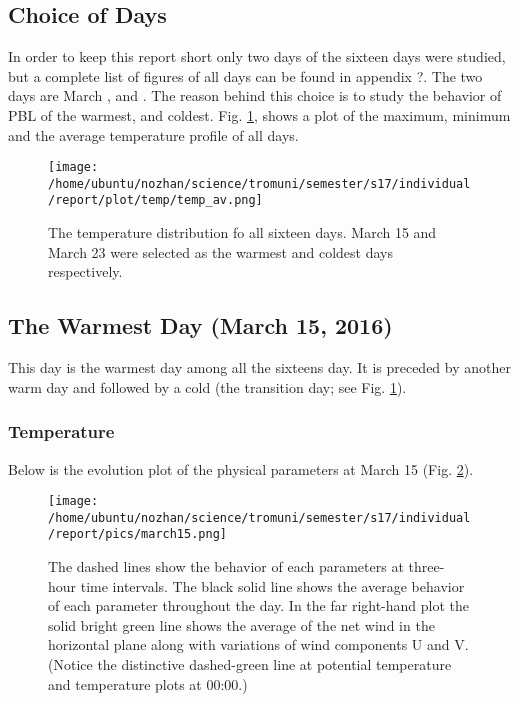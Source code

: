 \documentclass[a4paper,12pt]{article}
\numberwithin{equation}{section} %
\begin{document}
\subsection{Choice of Days}
In order to keep this report short only two days of the sixteen days were studied, but a complete list of figures of all days can be found in appendix ?. The two days are March , and . The reason behind this choice is to study the behavior of PBL of the warmest, and coldest. Fig. \ref{warmcold}, shows a plot of the maximum, minimum and the average temperature profile of all days.

\vspace{2.5 cm}

\begin{figure}[bhp]
	\texttt{[image: /home/ubuntu/nozhan/science/tromuni/semester/s17/individual/report/plot/temp/temp\_av.png]}
	\caption{The temperature distribution fo all sixteen days. March 15 and March 23 were selected as the warmest and coldest days respectively.}
	\label{warmcold}
\end{figure}


\subsection{The Warmest Day (March 15, 2016)}

This day is the warmest day among all the sixteens day. It is preceded by another warm day and followed by a cold (the transition day; see Fig. \ref{warmcold}).

\subsubsection{Temperature}

Below is the evolution plot of the physical parameters at March 15 (Fig. \ref{march15}).

\begin{figure}[bhp]
\texttt{[image: /home/ubuntu/nozhan/science/tromuni/semester/s17/individual/report/pics/march15.png]}
\caption{The dashed lines show the behavior of each parameters at three-hour time intervals. The black solid line shows the average behavior of each parameter throughout the day. In the far right-hand plot the solid bright green line shows the average of the net wind in the horizontal plane along with variations of wind components U and V. (Notice the distinctive dashed-green line at potential temperature and temperature plots at 00:00.)}
\label{march15}
\end{figure}
\end{document}
